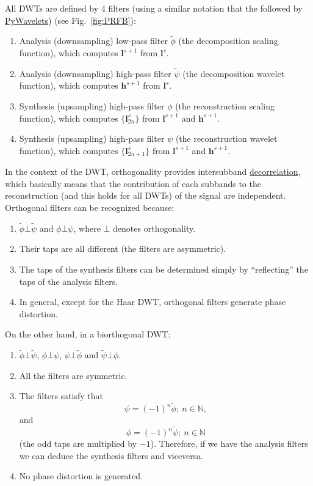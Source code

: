All DWTs are defined by 4 filters (using a similar notation that the
followed by \href{https://pywavelets.readthedocs.io}{PyWavelets}) (see
Fig.~\ref{fig:PRFB}):
\begin{enumerate}
\item Analysis (downsampling) low-pass filter $\tilde\phi$ (the
  decomposition scaling function), which computes ${\mathbf l}^{s+1}$
  from ${\mathbf l}^s$.
\item Analysis (downsampling) high-pass filter $\tilde\psi$ (the
  decomposition wavelet function), which computes ${\mathbf h}^{s+1}$
  from ${\mathbf l}^s$.
\item Synthesis (upsampling) high-pass filter $\phi$ (the
  reconstruction scaling function), which computes $\{{\mathbf
    l}^s_{2n}\}$ from ${\mathbf l}^{s+1}$ and ${\mathbf h}^{s+1}$.
\item Synthesis (upsampling) high-pass filter $\psi$ (the
  reconstruction wavelet function), which computes $\{{\mathbf
    l}^s_{2n+1}\}$ from ${\mathbf l}^{s+1}$ and ${\mathbf h}^{s+1}$.
\end{enumerate}

In the context of the DWT, orthogonality provides intersubband
\href{https://en.wikipedia.org/wiki/Decorrelation}{decorrelation},
which basically means that the contribution of each subbands to the
reconstruction (and this holds for all DWTs) of the signal are
independent. Orthogonal filters can be recognized because:
\begin{enumerate}
\item $\tilde\phi\bot\tilde\psi$ and $\phi\bot\psi$, where $\bot$
  denotes orthogonality.
\item Their taps are all different (the filters are asymmetric).
\item The taps of the synthesis filters can be determined simply by
  ``reflecting'' the taps of the analysis filters.
\item In general, except for the Haar DWT, orthogonal filters generate
  phase distortion.
\end{enumerate}

On the other hand, in a biorthogonal DWT:
\begin{enumerate}
\item $\tilde\phi\bot\tilde\psi$, $\phi\bot\psi$, $\psi\bot\tilde\phi$
  and $\tilde\psi\bot\phi$.
\item All the filters are symmetric.
\item The filters satisfy that
  \begin{equation}
    \psi=(-1)^n\tilde\phi;~n\in\mathbb{N},
  \end{equation}
  and
  \begin{equation}
    \phi=(-1)^n\tilde\psi;~n\in\mathbb{N}
  \end{equation}
    (the odd taps are multiplied by $-1$). Therefore, if we have the
  analysis filters we can deduce the synthesis filters and viceversa.
\item No phase distortion is generated.
\end{enumerate}

